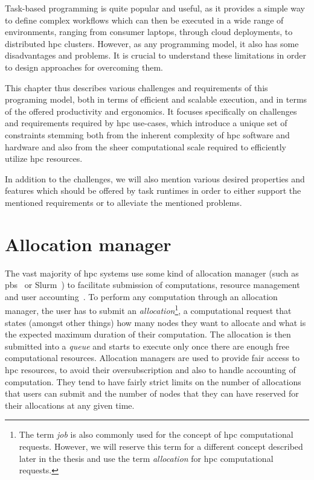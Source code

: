 Task-based programming is quite popular and useful, as it provides a simple way to define complex
workflows which can then be executed in a wide range of environments, ranging from consumer
laptops, through cloud deployments, to distributed \gls{hpc} clusters. However, as
any programming model, it also has some disadvantages and problems. It is crucial to understand
these limitations in order to design approaches for overcoming them.

This chapter thus describes various challenges and requirements of this programing model, both in
terms of efficient and scalable execution, and in terms of the offered productivity and ergonomics.
It focuses specifically on challenges and requirements required by \gls{hpc}
use-cases, which introduce a unique set of constraints stemming both from the inherent complexity
of \gls{hpc} software and hardware and also from the sheer computational scale
required to efficiently utilize \gls{hpc} resources.

In addition to the challenges, we will also mention various desired properties and features which
should be offered by task runtimes in order to either support the mentioned requirements or to
alleviate the mentioned problems.

\section{Allocation manager}
The vast majority of \gls{hpc} systems use some kind of allocation manager (such
as \gls{pbs}~\cite{pbs} or Slurm~\cite{slurm}) to
facilitate submission of computations, resource management and user
accounting~\cite{slurm-schedmd}. To perform any computation through an allocation manager,
the user has to submit an \emph{allocation}\footnote{The term \emph{job} is also commonly used for the concept of
\gls{hpc} computational requests. However, we will reserve this term for a different concept described later in the thesis and use the term
\emph{allocation} for \gls{hpc} computational requests.}, a computational
request that states (amongst other things) how many nodes they want to allocate and what is the
expected maximum duration of their computation. The allocation is then submitted into a
\emph{queue} and starts to execute only once there are enough free computational
resources. Allocation managers are used to provide fair access to \gls{hpc}
resources, to avoid their oversubscription and also to handle accounting of computation. They tend
to have fairly strict limits on the number of allocations that users can submit and the number of
nodes that they can have reserved for their allocations at any given time.

